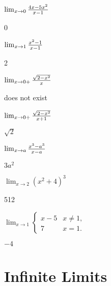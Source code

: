 \begin{exercises}
\begin{exercise} $\lim _{x\to 0 } {4x - 5x^2\over x-1}$
\begin{answer} 0
\end{answer}\end{exercise}

\begin{exercise} $\lim _{x\to 1 } {x^2 -1 \over x-1 }$
\begin{answer} 2
\end{answer}\end{exercise}

\begin{exercise} $\lim _{x\to 0 + } {\sqrt{2-x^2 }\over x}$
\begin{answer} does not exist
\end{answer}\end{exercise}

\begin{exercise} $\lim _{x\to 0 + } {\sqrt{2-x^2}\over x+1}$
\begin{answer} $\sqrt2$
\end{answer}\end{exercise}

\begin{exercise} $\lim _{x\to a } {x^3 -a^3\over x-a}$
\begin{answer} $3a^2$
\end{answer}\end{exercise}

\begin{exercise} $\lim _{x\to 2 } (x^2 +4)^3$
\begin{answer} 512
\end{answer}\end{exercise}

\begin{exercise} $\lim _{x\to 1 } \begin{cases}
x-5 & x\ne 1, \\
7 & x=1. \end{cases}$
\begin{answer} $-4$
\end{answer}\end{exercise}

\endtwocol

\end{exercises}






\section{Infinite Limits}


